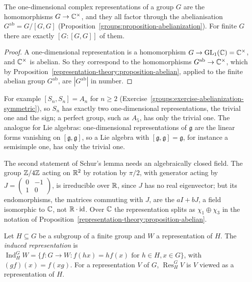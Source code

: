 \begin{corollary}\label{representation-theory:corollary-one-dimensional}
The one-dimensional complex representations of a group $G$ are the homomorphisms $G \to \mathbb{C}^\times$, and they all factor through the abelianisation $G^{\mathrm{ab}} = G/[G, G]$
(Proposition~\ref{groups:proposition-abelianization}). For finite $G$ there are exactly $[G : [G, G]]$ of them.
\end{corollary}

\begin{proof}
A one-dimensional representation is a homomorphism $G \to \mathrm{GL}_1(\mathbb{C}) = \mathbb{C}^\times$, and $\mathbb{C}^\times$ is abelian. So they correspond to the homomorphisms $G^{\mathrm{ab}} \to \mathbb{C}^\times$, which by
Proposition~\ref{representation-theory:proposition-abelian}, applied to the finite abelian group $G^{\mathrm{ab}}$, are $|G^{\mathrm{ab}}|$ in number.
\end{proof}

For example $[S_n, S_n] = A_n$ for $n \geq 2$ (Exercise~\ref{groups:exercise-abelianization-symmetric}), so $S_n$ has exactly two one-dimensional representations, the trivial one and the sign; a
perfect group, such as $A_5$, has only the trivial one. The analogue for Lie algebras: one-dimensional representations of $\mathfrak{g}$ are the linear forms vanishing on $[\mathfrak{g}, \mathfrak{g}]$,
so a Lie algebra with $[\mathfrak{g}, \mathfrak{g}] = \mathfrak{g}$, for instance a semisimple one, has only the trivial one.

\begin{counterexample}\label{representation-theory:counterexample-schur-real}
The second statement of Schur's lemma needs an algebraically closed field. The group $\mathbb{Z}/4\mathbb{Z}$ acting on $\mathbb{R}^2$ by rotation by $\pi/2$, with generator acting by $J = \begin{pmatrix}0 & -1\\ 1 & 0\end{pmatrix}$, is irreducible over $\mathbb{R}$,
since $J$ has no real eigenvector; but its endomorphisms, the matrices commuting with $J$, are the $aI + bJ$, a field isomorphic to $\mathbb{C}$, not $\mathbb{R}\cdot\mathrm{id}$. Over $\mathbb{C}$ the representation splits as $\chi_1 \oplus \chi_3$ in the notation of
Proposition~\ref{representation-theory:proposition-abelian}.
\end{counterexample}

\begin{definition}\label{representation-theory:definition-induced}
Let $H \subseteq G$ be a subgroup of a finite group and $W$ a representation of $H$. The \emph{induced representation} is
$\operatorname{Ind}_H^GW = \{f \colon G \to W : f(hx) = hf(x) \text{ for } h \in H, x \in G\}$, with $(gf)(x) = f(xg)$. For a representation $V$ of $G$, $\operatorname{Res}^G_HV$ is $V$ viewed as a representation of $H$.
\end{definition}

